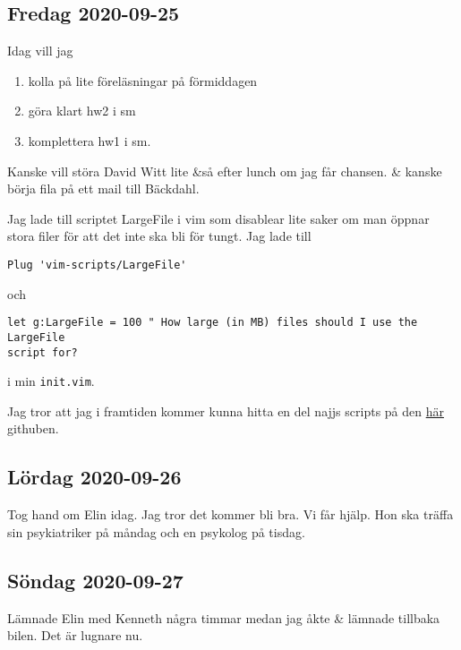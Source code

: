 \subsection{Fredag 2020-09-25}

Idag vill jag
\begin{enumerate}
	\item kolla på lite föreläsningar på förmiddagen
	\item göra klart hw2 i sm
	\item komplettera hw1 i sm.
\end{enumerate}

Kanske vill störa David Witt lite \&så efter lunch om jag får chansen. \& kanske börja fila på ett mail till Bäckdahl.

\bigskip

Jag lade till scriptet LargeFile i vim som disablear lite saker om man öppnar stora filer för att det inte ska bli för tungt. Jag lade till
\begin{verbatim}
Plug 'vim-scripts/LargeFile'
\end{verbatim}
och
\begin{verbatim}
let g:LargeFile = 100 " How large (in MB) files should I use the LargeFile
script for?
\end{verbatim}
i min \verb|init.vim|.

Jag tror att jag i framtiden kommer kunna hitta en del najjs scripts på den \href{https://github.com/vim-scripts}{\color{blue}här} githuben.


\subsection{Lördag 2020-09-26}

Tog hand om Elin idag. Jag tror det kommer bli bra. Vi får hjälp. Hon ska träffa sin psykiatriker på måndag och en psykolog på tisdag.


\subsection{Söndag 2020-09-27}

Lämnade Elin med Kenneth några timmar medan jag åkte \& lämnade tillbaka bilen. Det är lugnare nu.

